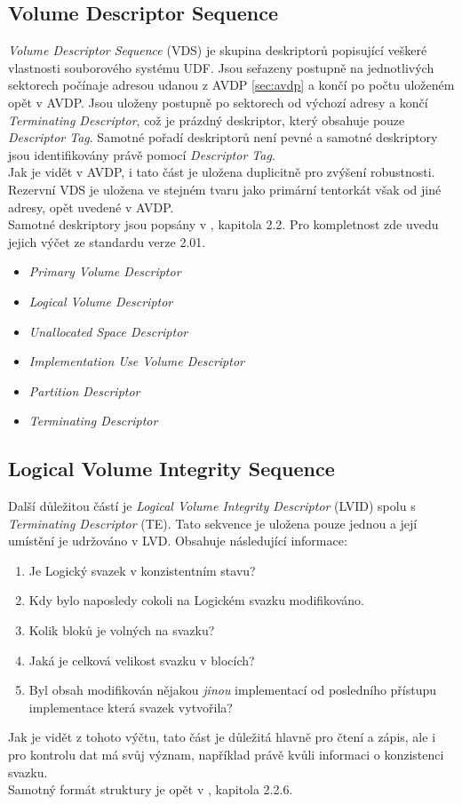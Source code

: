 \subsection{Volume Descriptor Sequence}
\label{sec:vds}
\textit{Volume Descriptor Sequence} (VDS) je skupina deskriptorů popisující veškeré vlastnosti souborového systému UDF. Jsou seřazeny postupně na jednotlivých sektorech počínaje adresou udanou z AVDP \ref{sec:avdp} a končí po počtu uloženém opět v AVDP. Jsou uloženy postupně po sektorech od výchozí adresy a končí \textit{Terminating Descriptor}, což je prázdný deskriptor, který obsahuje pouze \textit{Descriptor Tag}. Samotné pořadí deskriptorů není pevné a samotné deskriptory jsou identifikovány právě pomocí \textit{Descriptor Tag}.\\
Jak je vidět v AVDP, i tato část je uložena duplicitně pro zvýšení robustnosti. Rezervní VDS je uložena ve stejném tvaru jako primární tentorkát však od jiné adresy, opět uvedené v AVDP.\\
Samotné deskriptory jsou popsány v \cite{osta-udf-0201}, kapitola 2.2. Pro kompletnost zde uvedu jejich výčet ze standardu verze 2.01.
\begin{itemize}
    \item \textit{Primary Volume Descriptor}
    \item \textit{Logical Volume Descriptor}
    \item \textit{Unallocated Space Descriptor}
    \item \textit{Implementation Use Volume Descriptor}
    \item \textit{Partition Descriptor}
    \item \textit{Terminating Descriptor}
\end{itemize}

\subsection{Logical Volume Integrity Sequence}
\label{sec:lvid}
Další důležitou částí je \textit{Logical Volume Integrity Descriptor} (LVID) spolu s \textit{Terminating Descriptor} (TE). Tato sekvence je uložena pouze jednou a její umístění je udržováno v LVD. Obsahuje následující informace:
\begin{enumerate}
    \item Je Logický svazek v konzistentním stavu?
    \item Kdy bylo naposledy cokoli na Logickém svazku modifikováno.
    \item Kolik bloků je volných na svazku?
    \item Jaká je celková velikost svazku v blocích?
    \item Byl obsah modifikován nějakou \textit{jinou} implementací od posledního přístupu implementace která svazek vytvořila?
\end{enumerate}
Jak je vidět z tohoto výčtu, tato část je důležitá hlavně pro čtení a zápis, ale i pro kontrolu dat má svůj význam, například právě kvůli informaci o konzistenci svazku.\\ 
Samotný formát struktury je opět v \cite{osta-udf-0201}, kapitola 2.2.6.


